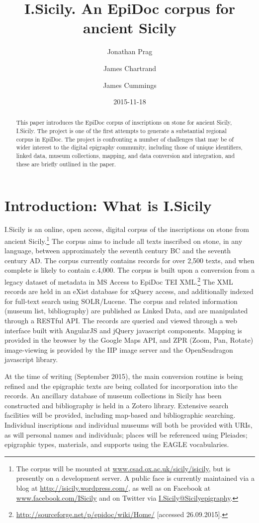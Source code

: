 \documentclass[amsthm,ebook]{saparticle}
\title{I.Sicily. An EpiDoc corpus for ancient Sicily}
\author[OXF]{Jonathan Prag\corref{first}}
\author[opensky]{James Chartrand}
\author[OXF]{James Cummings}
\date{2015-11-18}
\begin{document}
\maketitle
\begin{abstract}
This paper introduces the EpiDoc corpus of inscriptions on stone for ancient Sicily, I.Sicily. The project is one of the
first attempts to generate a substantial regional corpus in EpiDoc. The project is confronting a number of challenges
that may be of wider interest to the digital epigraphy community, including those of unique identifiers, linked data,
museum collections, mapping, and data conversion and integration, and these are briefly outlined in the paper.
\end{abstract}




\section{Introduction: What is I.Sicily}
\noindent I.Sicily is an online, open access, digital corpus of the inscriptions on stone from ancient Sicily.\footnote{ The
corpus will be mounted at \url{www.csad.ox.ac.uk/sicily/isicily}, but is presently on a development server. A public face is
currently maintained via a blog at \url{http://isicily.wordpress.com/}, as well as on Facebook at \url{www.facebook.com/ISicily}
and on Twitter via \url{I.Sicily@Sicilyepigraphy}.} The corpus aims to include all texts inscribed on stone, in any language,
between approximately the seventh century BC and the seventh century AD. The corpus currently contains records for over
2,500 texts, and when complete is likely to contain c.4,000. The corpus is built upon a conversion from a legacy
dataset of metadata in MS Access to EpiDoc TEI XML.\footnote{\url{http://sourceforge.net/p/epidoc/wiki/Home/} [accessed
26.09.2015].} The XML records are held in an eXist database for xQuery access, and additionally indexed for full-text
search using SOLR/Lucene. The corpus and related information (museum list, bibliography) are published as Linked Data,
and are manipulated through a RESTful API. The records are queried and viewed through a web interface built with
AngularJS and jQuery javascript components. Mapping is provided in the browser by the Google Maps API, and ZPR (Zoom,
Pan, Rotate) image-viewing is provided by the IIP image server and the OpenSeadragon javascript library.

At the time of writing (September 2015), the main conversion routine is being refined and the epigraphic texts are being
collated for incorporation into the records. An ancillary database of museum collections in Sicily has been constructed
and bibliography is held in a Zotero library. Extensive search facilities will be provided, including map-based and
bibliographic searching. Individual inscriptions and individual museums will both be provided with URIs, as will
personal names and individuals; places will be referenced using Pleiades; epigraphic types, materials, and supports
using the EAGLE vocabularies.
\end{document}

